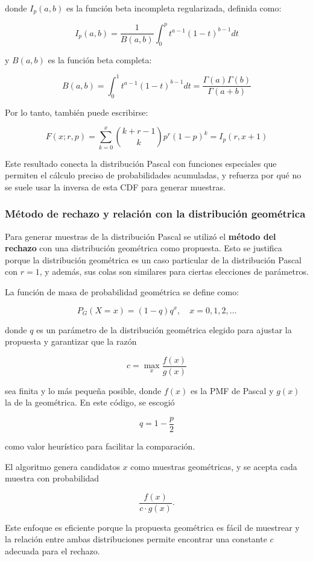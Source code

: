 \documentclass{article}
\begin{document}
donde \( I_p(a, b) \) es la función beta incompleta regularizada, definida como:

\[
I_p(a, b) = \frac{1}{B(a,b)} \int_0^p t^{a - 1} (1 - t)^{b - 1} dt
\]

y \( B(a, b) \) es la función beta completa:

\[
B(a, b) = \int_0^1 t^{a - 1} (1 - t)^{b - 1} dt = \frac{\Gamma(a)\Gamma(b)}{\Gamma(a + b)}
\]

Por lo tanto, también puede escribirse:

\[
F(x; r, p) = \sum_{k=0}^{x} \binom{k + r - 1}{k} p^r (1 - p)^k = I_p(r, x + 1)
\]

Este resultado conecta la distribución Pascal con funciones especiales que permiten el cálculo preciso de probabilidades acumuladas, y refuerza por qué no se suele usar la inversa de esta CDF para generar muestras.

\subsubsection{Método de rechazo y relación con la distribución geométrica}

Para generar muestras de la distribución Pascal se utilizó el \textbf{método del rechazo} con una distribución geométrica como propuesta. Esto se justifica porque la distribución geométrica es un caso particular de la distribución Pascal con $r=1$, y además, sus colas son similares para ciertas elecciones de parámetros.

La función de masa de probabilidad geométrica se define como:

\[
P_G(X = x) = (1 - q) q^x, \quad x=0,1,2,\ldots
\]

donde $q$ es un parámetro de la distribución geométrica elegido para ajustar la propuesta y garantizar que la razón

\[
c = \max_x \frac{f(x)}{g(x)}
\]

sea finita y lo más pequeña posible, donde $f(x)$ es la PMF de Pascal y $g(x)$ la de la geométrica. En este código, se escogió

\[
q = 1 - \frac{p}{2}
\]

como valor heurístico para facilitar la comparación.

El algoritmo genera candidatos $x$ como muestras geométricas, y se acepta cada muestra con probabilidad

\[
\frac{f(x)}{c \cdot g(x)}.
\]

Este enfoque es eficiente porque la propuesta geométrica es fácil de muestrear y la relación entre ambas distribuciones permite encontrar una constante $c$ adecuada para el rechazo.
\end{document}
